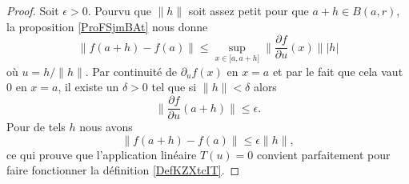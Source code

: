 \begin{proof}
    Soit \( \epsilon>0\). Pourvu que \( \| h \|\) soit assez petit pour que \( a+h\in B(a,r)\), la proposition \ref{ProFSjmBAt} nous donne
    \begin{equation}
        \| f(a+h)-f(a) \|\leq \sup_{x\in\mathopen[ a , a+h \mathclose]}\| \frac{ \partial f }{ \partial u }(x) \|  |h |
    \end{equation}
    où \( u=h/\| h \|\). Par continuité de \( \partial_uf(x)\) en \( x=a\) et par le fait que cela vaut \( 0\) en \( x=a\), il existe un \( \delta>0\) tel que si \( \| h \|<\delta\) alors
    \begin{equation}
        \| \frac{ \partial f }{ \partial u }(a+h) \|\leq \epsilon.
    \end{equation}
    Pour de tels \( h\) nous avons
    \begin{equation}
        \| f(a+h)-f(a) \|\leq \epsilon\| h \|,
    \end{equation}
    ce qui prouve que l'application linéaire \( T(u)=0\) convient parfaitement pour faire fonctionner la définition \ref{DefKZXtcIT}.
%

\end{proof}
